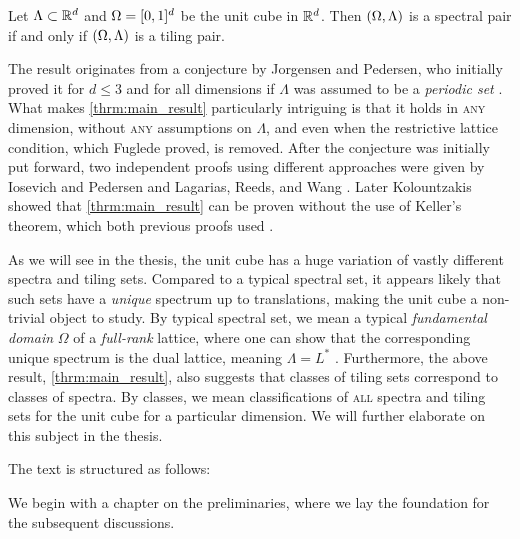 \documentclass[../thesis.tex]{subfiles}
\begin{document}
\begin{theorem}\label{thrm:main_result}
    Let $\Lambda\subset \mathbb{R}^d$ and $\Omega=[0,1]^d$ be the unit cube in $\mathbb{R}^d$. Then $(\Omega,\Lambda)$ is a spectral pair if and only if $(\Omega,\Lambda)$ is a tiling pair.
\end{theorem}

The result originates from a conjecture by Jorgensen and Pedersen, who initially proved it for $d\leq3$ and for all dimensions if $\Lambda$ was assumed to be a \emph{periodic set} \cite{jorgensenSpectralPairsCartesian2001}. What makes \cref{thrm:main_result} particularly intriguing is that it holds in \textsc{any} dimension, without \textsc{any} assumptions on $\Lambda$, and even when the restrictive lattice condition, which Fuglede proved, is removed. After the conjecture was initially put forward, two independent proofs using different approaches were given by Iosevich and Pedersen \cite{iosevichSpectralTilingProperties1998} and Lagarias, Reeds, and Wang \cite{lagariasOrthonormalBasesExponentials2000}. Later Kolountzakis showed that \cref{thrm:main_result} can be proven without the use of Keller's theorem, which both previous proofs used \cite{kolountzakisPackingTilingOrthogonality2000}. 

As we will see in the thesis, the unit cube has a huge variation of vastly different spectra and tiling sets. Compared to a typical spectral set, it appears likely that such sets have a \emph{unique} spectrum up to translations, making the unit cube a non-trivial object to study. By typical spectral set, we mean a typical \emph{fundamental domain} $\Omega$ of a \emph{full-rank} lattice, where one can show that the corresponding unique spectrum is the dual lattice, meaning $\Lambda = L^*$ \cite{lagariasOrthonormalBasesExponentials2000}. Furthermore, the above result, \cref{thrm:main_result}, also suggests that classes of tiling sets correspond to classes of spectra. By classes, we mean classifications of \textsc{all} spectra and tiling sets for the unit cube for a particular dimension. We will further elaborate on this subject in the thesis. 

%
The text is structured as follows:

We begin with a chapter on the preliminaries, where we lay the foundation for the subsequent discussions.
\end{document}
